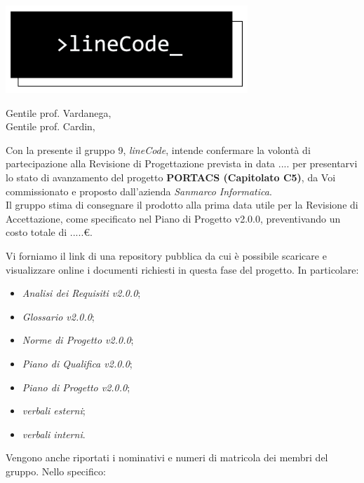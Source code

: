 \documentclass[12pt]{letter}
\date{15 marzo 2021}
\begin{document}
\begin{letter}{ }

\includegraphics[scale=0.5]{../../commons/res/lclong.png}

\opening{Gentile prof. Vardanega,\\ Gentile prof. Cardin, }

Con la presente il gruppo 9, \textit{lineCode}, intende confermare la volontà di partecipazione alla Revisione di Progettazione prevista in data .... per presentarvi lo stato di avanzamento del progetto
\textbf{PORTACS (Capitolato C5)}, da Voi commissionato e proposto dall'azienda \textit{Sanmarco Informatica}. \\
Il gruppo stima di consegnare il prodotto alla prima data utile per la Revisione di Accettazione, come specificato nel Piano di Progetto v2.0.0, preventivando un costo totale di .....\euro.


Vi forniamo il link di una repository pubblica da cui è possibile scaricare e visualizzare online i documenti richiesti in questa fase del progetto.
In particolare:

\begin{itemize}
	\item \textit{Analisi dei Requisiti v2.0.0};
	\item \textit{Glossario v2.0.0};
	\item \textit{Norme di Progetto v2.0.0};
	\item \textit{Piano di Qualifica v2.0.0};
	\item \textit{Piano di Progetto v2.0.0};
	\item \textit{verbali esterni};
	\item \textit{verbali interni}.

\end{itemize}

\newpage

Vengono anche riportati i nominativi e numeri di matricola dei membri del gruppo. Nello specifico:


\end{letter}
\end{document}
